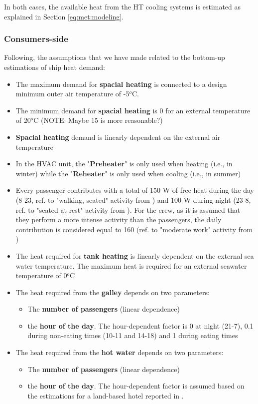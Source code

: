 \documentclass[preprint,12pt]{elsarticle}
\begin{document}
In both cases, the available heat from the HT cooling systems is estimated as explained in Section \ref{eq:met:modeling}.



\subsubsection*{Consumers-side}
Following, the assumptions that we have made related to the bottom-up estimations of ship heat demand:
\begin{itemize}
	\item The maximum demand for \textbf{spacial heating} is connected to a design minimum outer air temperature of -5$^o$C.
	\item The minimum demand for \textbf{spacial heating} is 0 for an external temperature of 20$^o$C (NOTE: Maybe 15 is more reasonable?)
	\item \textbf{Spacial heating} demand is linearly dependent on the external air temperature
	\item In the HVAC unit, the "\textbf{Preheater}" is only used when heating (i.e., in winter) while the "\textbf{Reheater}" is only used when cooling (i.e., in summer)
	\item Every passenger contributes with a total of 150 W of free heat during the day (8-23, ref. to "walking, seated" activity from \cite{Wang2000}) and 100 W during night (23-8, ref. to "seated at rest" activity from \cite{Wang2000}). For the crew, as it is assumed that they perform a more intense activity than the passengers, the daily contribution is considered equal to 160 (ref. to "moderate work" activity from \cite{Wang2000}) 
	\item The heat required for \textbf{tank heating} is linearly dependent on the external sea water temperature. The maximum heat is required for an external seawater temperature of 0$^o$C
	\item The heat required from the \textbf{galley} depends on two parameters:
	\begin{itemize}
		\item The \textbf{number of passengers} (linear dependence)
		\item the \textbf{hour of the day}. The hour-dependent factor is 0 at night (21-7), 0.1 during non-eating times (10-11 and 14-18) and 1 during eating times
	\end{itemize}
	\item The heat required from the \textbf{hot water} depends on two parameters:
	\begin{itemize}
		\item The \textbf{number of passengers} (linear dependence)
		\item the \textbf{hour of the day}. The hour-dependent factor is assumed based on the estimations for a land-based hotel reported in \cite{Chung2015}.
	\end{itemize}   
\end{itemize}
\end{document}
